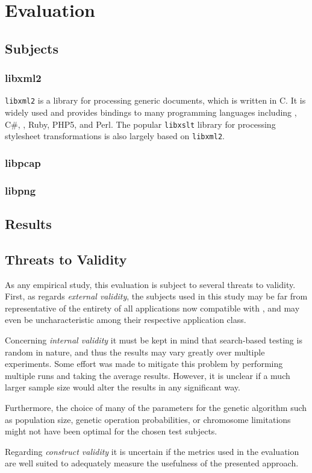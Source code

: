 \section{Evaluation}
\label{sec:evaluation}
\subsection{Subjects}
\subsubsection{libxml2}
\texttt{libxml2} is a library for processing generic \xml documents, which is written in
{\small C}. It is widely used and provides bindings to many programming languages including \cpp, 
{\small C\#}, \python{}, {\small Ruby}, {\small PHP5}, and {\small Perl}. The popular \texttt{libxslt} library
for processing \xml stylesheet transformations is also largely based on \texttt{libxml2}.
\subsubsection{libpcap}
\subsubsection{libpng}
\subsection{Results}
\subsection{Threats to Validity}
As any empirical study, this evaluation is subject to several threats to validity.
First, as regards \emph{external validity}, the subjects used in this study may be far from representative of
the entirety of all applications now compatible with \xmlmate, and may even be uncharacteristic among their
respective application class.

Concerning \emph{internal validity} it must be kept in mind that search-based testing is random in nature, and
thus the results may vary greatly over multiple experiments. Some effort was made to mitigate this problem by
performing multiple runs and taking the average results. However, it is unclear if a much larger sample size
would alter the results in any significant way.

Furthermore, the choice of many of the parameters for the genetic algorithm such as population size,
genetic operation probabilities, or chromosome limitations might not have been optimal for the chosen test
subjects.

Regarding \emph{construct validity} it is uncertain if the metrics used in the evaluation are well suited
to adequately measure the usefulness of the presented approach.
 

